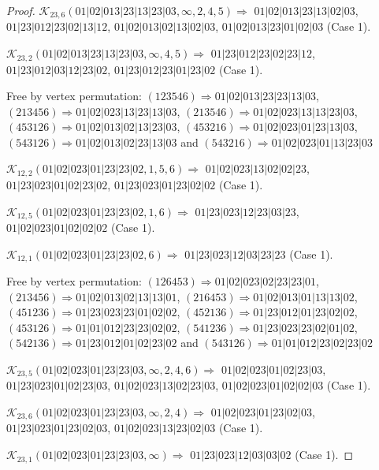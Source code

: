 \documentclass[12pt]{article}
\theoremstyle{plain}
\theoremstyle{definition}
\theoremstyle{remark}
\newcommand{\fancy}[1]{\mathcal{#1}}
\def\K{\fancy{K}}
\begin{document}
\begin{proof}
	$\K_{23,6}(01|02|013|23|13|23|03,\infty,2, 4, 5)\Rightarrow $ $01|02|013|23|13|02|03$, $01|23|012|23|02|13|12$, $01|02|013|02|13|02|03$, $01|02|013|23|01|02|03$ (Case 1).
	
	$\K_{23,2}(01|02|013|23|13|23|03,\infty,4, 5)\Rightarrow $ $01|23|012|23|02|23|12$, $01|23|012|03|12|23|02$, $01|23|012|23|01|23|02$ (Case 1).
	
	
	
	Free by vertex permutation: $(1 2 3 5 4 6)\Rightarrow 01|02|013|23|23|13|03$, $(2 1 3 4 5 6)\Rightarrow 01|02|023|13|23|13|03$, $(2 1 3 5 4 6)\Rightarrow 01|02|023|13|13|23|03$, $(4 5 3 1 2 6)\Rightarrow 01|02|013|02|13|23|03$, $(4 5 3 2 1 6)\Rightarrow 01|02|023|01|23|13|03$, $(5 4 3 1 2 6)\Rightarrow 01|02|013|02|23|13|03$ and $(5 4 3 2 1 6)\Rightarrow 01|02|023|01|13|23|03$
	
	
	
	\bigskip
	
	$\K_{12,2}(01|02|023|01|23|23|02,1, 5, 6)\Rightarrow $ $01|02|023|13|02|02|23$, $01|23|023|01|02|23|02$, $01|23|023|01|23|02|02$ (Case 1).
	
	$\K_{12,5}(01|02|023|01|23|23|02,1, 6)\Rightarrow $ $01|23|023|12|23|03|23$, $01|02|023|01|02|02|02$ (Case 1).
	
	$\K_{12,1}(01|02|023|01|23|23|02,6)\Rightarrow $ $01|23|023|12|03|23|23$ (Case 1).
	
	
	
	Free by vertex permutation: $(1 2 6 4 5 3)\Rightarrow 01|02|023|02|23|23|01$, $(2 1 3 4 5 6)\Rightarrow 01|02|013|02|13|13|01$, $(2 1 6 4 5 3)\Rightarrow 01|02|013|01|13|13|02$, $(4 5 1 2 3 6)\Rightarrow 01|23|023|23|01|02|02$, $(4 5 2 1 3 6)\Rightarrow 01|23|012|01|23|02|02$, $(4 5 3 1 2 6)\Rightarrow 01|01|012|23|23|02|02$, $(5 4 1 2 3 6)\Rightarrow 01|23|023|23|02|01|02$, $(5 4 2 1 3 6)\Rightarrow 01|23|012|01|02|23|02$ and $(5 4 3 1 2 6)\Rightarrow 01|01|012|23|02|23|02$
	
	
	
	\bigskip
	
	$\K_{23,5}(01|02|023|01|23|23|03,\infty,2, 4, 6)\Rightarrow $ $01|02|023|01|02|23|03$, $01|23|023|01|02|23|03$, $01|02|023|13|02|23|03$, $01|02|023|01|02|02|03$ (Case 1).
	
	$\K_{23,6}(01|02|023|01|23|23|03,\infty,2, 4)\Rightarrow $ $01|02|023|01|23|02|03$, $01|23|023|01|23|02|03$, $01|02|023|13|23|02|03$ (Case 1).
	
	$\K_{23,1}(01|02|023|01|23|23|03,\infty)\Rightarrow $ $01|23|023|12|03|03|02$ (Case 1).
	

\end{proof}
\end{document}
